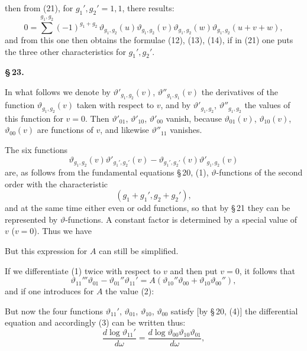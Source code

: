 then from (21), for $g_1', g_2' = 1,1$, there results:
\[
0 = \sum\limits^{g_1,g_2} (-1)^{g_1+g_2}\,\vartheta_{g_1,g_2}(u)\vartheta_{g_1,g_2}(v)\vartheta_{g_1,g_2}(w)\vartheta_{g_1,g_2}(u+v+w),
\]
and from this one then obtains the formulae (12), (13), (14), if in (21) one puts the three other characteristics for $g_1', g_2'$.

\begin{center}
\textbf{\S\,23. }
\end{center}

In what follows we denote by $\vartheta'_{g_1,g_2}(v)$, $\vartheta''_{g_1,g_1}(v)$ %
the derivatives of the function $\vartheta_{g_1,g_2}(v)$ taken with respect to $v$, and by $\vartheta'_{g_1,g_2}$, $\vartheta''_{g_1,g_2}$ the values of this function for $v=0$. Then $\vartheta'_{01}$, $\vartheta'_{10}$, $\vartheta'_{00}$ vanish, because $\vartheta_{01}(v)$, $\vartheta_{10}(v)$, $\vartheta_{00}(v)$ are  functions of $v$, and likewise $\vartheta''_{11}$ vanishes.

The six functions
\[
\vartheta_{g_1,g_2}(v)\vartheta'_{g_1',g_2'}(v) - \vartheta_{g_1',g_2'}(v)\vartheta'_{g_1,g_2}(v)
\]
are, as follows from the fundamental equations \S\,20, (1), $\vartheta$-functions of the second order with the characteristic
\[
(g_1+g_1', g_2+g_2'),
\]
and at the same time either even or odd functions, so that by \S\,21 they can be represented by $\vartheta$-functions. A constant factor is determined by a special value of $v$ ($v=0$). Thus we have

But this expression for $A$ can still be simplified.

If we differentiate (1) twice with respect to $v$ and then put $v=0$, it follows that
\[
\vartheta_{11}'''\vartheta_{01} - \vartheta_{01}''\vartheta_{11}' = A(\vartheta_{10}''\vartheta_{00} + \vartheta_{10}\vartheta_{00}''),
\]
and if one introduces for $A$ the value (2):

But now the four functions $\vartheta_{11}'$, $\vartheta_{01}$, $\vartheta_{10}$, $\vartheta_{00}$ satisfy [by \S\,20, (4)] the differential equation
and accordingly (3) can be written thus:
\[
\frac{d\log \vartheta_{11}'}{d\omega} = \frac{d\log \vartheta_{00}\vartheta_{10}\vartheta_{01}}{d\omega},
\]

